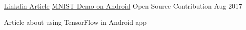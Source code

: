 \begin{cventries}
    \cventry
    {\href{https://www.linkedin.com/pulse/handwritten-digits-classification-from-mnist-android-keras-sawale/}{Linkdin Article}} %
    {\href{https://www.linkedin.com/pulse/handwritten-digits-classification-from-mnist-android-keras-sawale/}{MNIST Demo on Android}} %
    {Open Source Contribution} %
    {Aug 2017} %
    {
      \begin{cvitems} %
        \item {Article about using TensorFlow in Android app} 
      \end{cvitems}
    }










\end{cventries}
